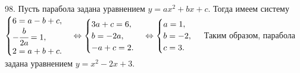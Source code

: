 98. Пусть парабола задана уравнением $y=ax^2+bx+c.$ Тогда имеем систему $\begin{cases} 6=a-b+c,\\ -\cfrac{b}{2a}=1,\\ 2=a+b+c.\end{cases}\Leftrightarrow
\begin{cases} 3a+c=6,\\ b=-2a,\\ -a+c=2.\end{cases}\Leftrightarrow \begin{cases} a=1,\\ b=-2,\\ c=3.\end{cases}$ Таким образом, парабола задана уравнением $y=x^2-2x+3.$\\
